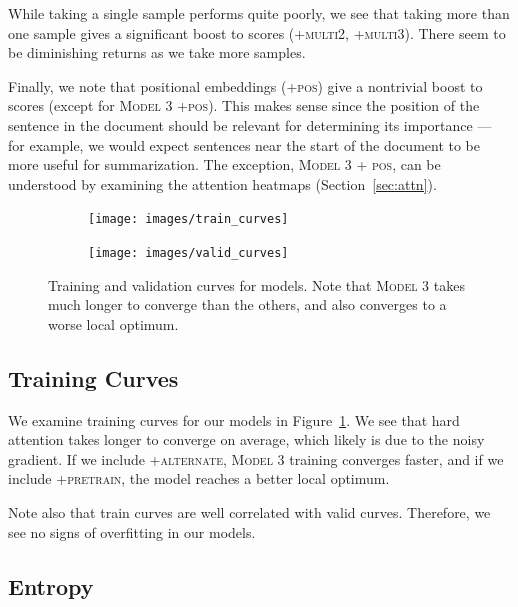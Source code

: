 \documentclass[12pt]{report}
\begin{document}
While taking a single sample performs quite poorly, we see that taking more than one sample gives a significant boost to scores (\textsc{+multi2}, \textsc{+multi3}). There seem to be diminishing returns as we take more samples.

Finally, we note that positional embeddings (\textsc{+pos}) give a nontrivial boost to scores (except for \textsc{Model 3 +pos}). This makes sense since the position of the sentence in the document should be relevant for determining its importance --- for example, we would expect sentences near the start of the document to be more useful for summarization. The exception, \textsc{Model 3 + pos}, can be understood by examining the attention heatmaps (Section~\ref{sec:attn}).



\begin{figure}[t]
\centering
\begin{subfigure}{0.45\textwidth}
\texttt{[image: images/train\_curves]}
\end{subfigure}
\begin{subfigure}{0.45\textwidth}
\texttt{[image: images/valid\_curves]}
\end{subfigure}

\caption[Training Curves]{Training and validation curves for models. Note that \textsc{Model 3} takes much longer to converge than the others, and also converges to a worse local optimum.} %
\label{fig:train_curves}
\end{figure}


\subsection{Training Curves} We examine training curves for our models in Figure~\ref{fig:train_curves}. We see that hard attention takes longer to converge on average, which likely is due to the noisy gradient.
If we include \textsc{+alternate}, \textsc{Model 3} training converges faster, and if we include \textsc{+pretrain}, the model reaches a better local optimum.

Note also that train curves are well correlated with valid curves. Therefore, we see no signs of overfitting in our models.


\subsection{Entropy}
\end{document}
